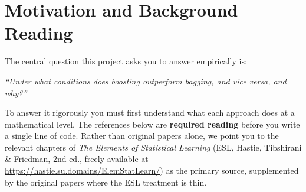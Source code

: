 \documentclass[11pt,a4paper]{article}
\begin{document}
\section{Motivation and Background Reading}\label{sec:background}
The central question this project asks you to answer empirically is:
\begin{center}
\textit{``Under what conditions does boosting outperform bagging, and vice versa, and why?''}
\end{center}
To answer it rigorously you must first understand what each approach does at a mathematical level. The references below are \textbf{required reading} before you write a single line of code. Rather than original papers alone, we point you to the relevant chapters of \textit{The Elements of Statistical Learning} (ESL, Hastie, Tibshirani \& Friedman, 2nd ed., freely available at \url{https://hastie.su.domains/ElemStatLearn/}) as the primary source, supplemented by the original papers where the ESL treatment is thin.
\end{document}
